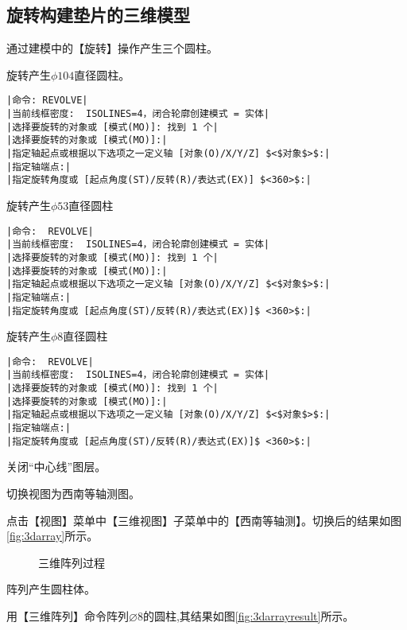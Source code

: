 \subsection{旋转构建垫片的三维模型}
\begin{procedure}
\item 通过建模中的【旋转】操作产生三个圆柱。

旋转产生$\phi 104$直径圆柱。
\begin{lstlisting}
|命令: REVOLVE|
|当前线框密度:  ISOLINES=4，闭合轮廓创建模式 = 实体|
|选择要旋转的对象或 [模式(MO)]: 找到 1 个|
|选择要旋转的对象或 [模式(MO)]:|
|指定轴起点或根据以下选项之一定义轴 [对象(O)/X/Y/Z] $<$对象$>$:|
|指定轴端点:|
|指定旋转角度或 [起点角度(ST)/反转(R)/表达式(EX)] $<360>$:|
\end{lstlisting}
旋转产生$\phi 53$直径圆柱
\begin{lstlisting}
|命令:  REVOLVE|
|当前线框密度:  ISOLINES=4，闭合轮廓创建模式 = 实体|
|选择要旋转的对象或 [模式(MO)]: 找到 1 个|
|选择要旋转的对象或 [模式(MO)]:|
|指定轴起点或根据以下选项之一定义轴 [对象(O)/X/Y/Z] $<$对象$>$:|
|指定轴端点:|
|指定旋转角度或 [起点角度(ST)/反转(R)/表达式(EX)]$ <360>$:|
\end{lstlisting}
旋转产生$\phi 8$直径圆柱
\begin{lstlisting}
|命令:  REVOLVE|
|当前线框密度:  ISOLINES=4，闭合轮廓创建模式 = 实体|
|选择要旋转的对象或 [模式(MO)]: 找到 1 个|
|选择要旋转的对象或 [模式(MO)]:|
|指定轴起点或根据以下选项之一定义轴 [对象(O)/X/Y/Z] $<$对象$>$:|
|指定轴端点:|
|指定旋转角度或 [起点角度(ST)/反转(R)/表达式(EX)]$ <360>$:|
\end{lstlisting}
\item 关闭“中心线”图层。
\item 切换视图为西南等轴测图。

点击【视图】菜单中【三维视图】子菜单中的【西南等轴测】。切换后的结果如图\ref{fig:3darray}所示。
\begin{figure}[htbp]
\centering
{}\hspace{30pt}
\hspace{30pt}
\caption{三维阵列过程}
\end{figure}
\item 阵列产生圆柱体。

用【三维阵列】命令阵列$\diameter 8$的圆柱,其结果如图\ref{fig:3darrayresult}所示。


\end{procedure}

